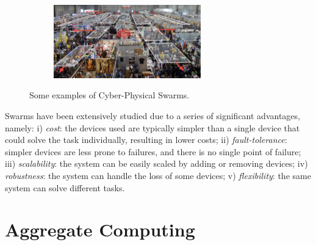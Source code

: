 \documentclass[12pt,a4paper,openright,twoside]{book}
\begin{document}
\begin{figure}[t]
\begin{subfigure}[b]{0.49\textwidth}
        \centering
        \includegraphics[width=0.7\textwidth]{figures/crowd.png}
    \end{subfigure}
    \caption{Some examples of Cyber-Physical Swarms.}%
    \label{fig:cpsw}
\end{figure}


Swarms have been extensively studied due to a series of significant advantages, namely:
    i) \emph{cost}: the devices used are typically simpler than a single device that could solve the task individually, resulting in lower costs;
    ii) \emph{fault-tolerance}: simpler devices are less prone to failures, and there is no single point of failure;
    iii) \emph{scalability}: the system can be easily scaled by adding or removing devices;
    iv) \emph{robustness}: the system can handle the loss of some devices;
    v) \emph{flexibility}: the same system can solve different tasks.

%
\section{Aggregate Computing}
\end{document}

